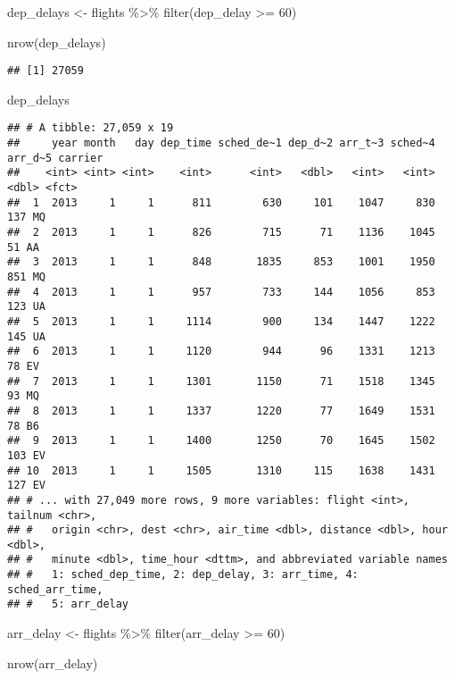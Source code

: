 \documentclass[
]{article}
\newenvironment{Shaded}{\begin{snugshade}}{\end{snugshade}}
\newcommand{\DecValTok}[1]{\textcolor[rgb]{0.00,0.00,0.81}{#1}}
\newcommand{\FunctionTok}[1]{\textcolor[rgb]{0.00,0.00,0.00}{#1}}
\newcommand{\NormalTok}[1]{#1}
\newcommand{\OtherTok}[1]{\textcolor[rgb]{0.56,0.35,0.01}{#1}}
\newcommand{\SpecialCharTok}[1]{\textcolor[rgb]{0.00,0.00,0.00}{#1}}
\begin{document}
\begin{Shaded}
\begin{Highlighting}[]
\NormalTok{  dep\_delays }\OtherTok{\textless{}{-}}\NormalTok{ flights }\SpecialCharTok{\%\textgreater{}\%}
                \FunctionTok{filter}\NormalTok{(dep\_delay }\SpecialCharTok{\textgreater{}=} \DecValTok{60}\NormalTok{)}

  \FunctionTok{nrow}\NormalTok{(dep\_delays)}
\end{Highlighting}
\end{Shaded}

\begin{verbatim}
## [1] 27059
\end{verbatim}

\begin{Shaded}
\begin{Highlighting}[]
\NormalTok{  dep\_delays}
\end{Highlighting}
\end{Shaded}

\begin{verbatim}
## # A tibble: 27,059 x 19
##     year month   day dep_time sched_de~1 dep_d~2 arr_t~3 sched~4 arr_d~5 carrier
##    <int> <int> <int>    <int>      <int>   <dbl>   <int>   <int>   <dbl> <fct>  
##  1  2013     1     1      811        630     101    1047     830     137 MQ     
##  2  2013     1     1      826        715      71    1136    1045      51 AA     
##  3  2013     1     1      848       1835     853    1001    1950     851 MQ     
##  4  2013     1     1      957        733     144    1056     853     123 UA     
##  5  2013     1     1     1114        900     134    1447    1222     145 UA     
##  6  2013     1     1     1120        944      96    1331    1213      78 EV     
##  7  2013     1     1     1301       1150      71    1518    1345      93 MQ     
##  8  2013     1     1     1337       1220      77    1649    1531      78 B6     
##  9  2013     1     1     1400       1250      70    1645    1502     103 EV     
## 10  2013     1     1     1505       1310     115    1638    1431     127 EV     
## # ... with 27,049 more rows, 9 more variables: flight <int>, tailnum <chr>,
## #   origin <chr>, dest <chr>, air_time <dbl>, distance <dbl>, hour <dbl>,
## #   minute <dbl>, time_hour <dttm>, and abbreviated variable names
## #   1: sched_dep_time, 2: dep_delay, 3: arr_time, 4: sched_arr_time,
## #   5: arr_delay
\end{verbatim}

\begin{Shaded}
\begin{Highlighting}[]
\NormalTok{  arr\_delay }\OtherTok{\textless{}{-}}\NormalTok{ flights }\SpecialCharTok{\%\textgreater{}\%}
                \FunctionTok{filter}\NormalTok{(arr\_delay }\SpecialCharTok{\textgreater{}=} \DecValTok{60}\NormalTok{)}

  \FunctionTok{nrow}\NormalTok{(arr\_delay)  }
\end{Highlighting}
\end{Shaded}
\end{document}
